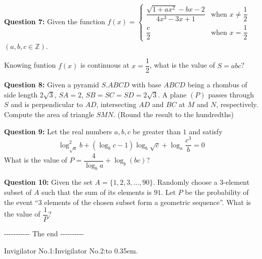 \documentclass[12pt,a4paper]{article}
\newcommand{\Q}[1]{\textcolor{qblue}{\textbf{Question #1:}}}
\newcommand{\dotsfill}{\leavevmode\cleaders\hbox to 0.35em{\hss.\hss}\hfill\kern0pt}
\begin{document}
\newpage
\Q{7} Given the function $f(x)=\begin{cases}\dfrac{\sqrt{1+ax^2}-bx-2}{4x^3-3x+1} & \text{when } x\neq\dfrac12\\[10pt] \dfrac{c}{2} & \text{when } x=\dfrac12\end{cases}$ $(a,b,c\in\mathbb{Z})$.\par
\hspace*{0.6cm}Knowing funtion $f(x)$ is continuous at $x=\dfrac12$, what is the value of $S=abc$?

\Q{8} Given a pyramid $S.ABCD$ with base $ABCD$ being a rhombus of side length $2\sqrt3$, $SA=2$, $SB=SC=SD=2\sqrt3$. A plane $(P)$ passes through $S$ and is perpendicular to $AD$, intersecting $AD$ and $BC$ at $M$ and $N$, respectively. Compute the area of triangle $SMN$. (Round the result to the hundredths)

\Q{9} Let the real numbers $a,b,c$ be greater than $1$ and satisfy
\[\log^2_{\sqrt a}b+\left(\log_b c-1\right)\log_b\sqrt c+\log_a\frac{c^3}{b}=0\]
\hspace*{0.6cm}What is the value of $P=\dfrac{4}{\log_b a}+\log_b(bc)$?

\Q{10} Given the set $A=\{1,2,3,\ldots,90\}$. Randomly choose a $3$-element subset of $A$ such that the sum of its elements is $91$. Let $P$ be the probability of the event ``3 elements of the chosen subset form a geometric sequence''. What is the value of $\dfrac1P$?

\vspace{14pt}
\begin{center}-{}-{}-{}-{}-{}-{}-{}-{}-{}-{}-{} The end -{}-{}-{}-{}-{}-{}-{}-{}-{}-{}\end{center}

\vfill
Invigilator No.1:\makebox[0.33\linewidth]{\dotsfill}\hspace{1em}Invigilator No.2:\dotsfill
\end{document}
